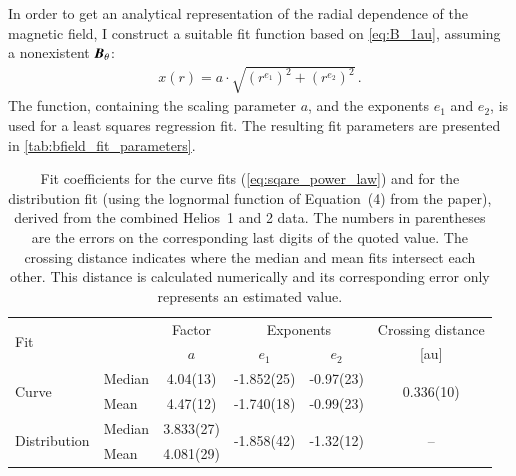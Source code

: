 In order to get an analytical representation of the radial dependence of the magnetic field, I construct a suitable fit function based on \autoref{eq:B_1au}, assuming a nonexistent $\boldsymbol{B}_\theta$:
\begin{align}
	x(r) = a \cdot \sqrt{\left(r^{e_1}\right)^2 + \left(r^{e_2}\right)^2}	\,.	\label{eq:sqare_power_law}
\end{align}
The function, containing the scaling parameter $a$, and the exponents $e_1$ and $e_2$, is used for a least squares regression fit. The resulting fit parameters are presented in \autoref{tab:bfield_fit_parameters}.
\begin{table}
	\caption{Fit coefficients for the curve fits (\autoref{eq:sqare_power_law}) and for the distribution fit (using the lognormal function of Equation~(4) from the paper), derived from the combined Helios~1 and 2 data. The numbers in parentheses are the errors on the corresponding last digits of the quoted value. The crossing distance indicates where the median and mean fits intersect each other. This distance is calculated numerically and its corresponding error only represents an estimated value.}
	\label{tab:bfield_fit_parameters}
	\centering
	\begin{tabular}{l l c c c c}
		\hline\hline
		\multirow{2}{*}{Fit}	&	&Factor	&\multicolumn{2}{c}{Exponents}	&Crossing distance\\
		\cline{4-5}
			&	&$a$	&$e_1$	&$e_2$	&[au]\\
		\hline
		\multirow{2}{*}{Curve}	&Median	&4.04(13)	&-1.852(25)	&-0.97(23)	&\multirow{2}{*}{0.336(10)}\\
			&Mean	&4.47(12)	&-1.740(18)	&-0.99(23)	&\\
		\multirow{2}{*}{Distribution}	&Median	&3.833(27)	&\multirow{2}{*}{-1.858(42)}	&\multirow{2}{*}{-1.32(12)}	&\multirow{2}{*}{--}\\
			&Mean	&4.081(29)	&	&	&\\
		\hline
	\end{tabular}
\end{table}
